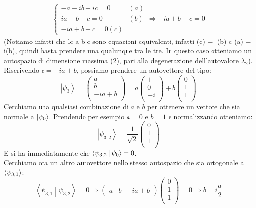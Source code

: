 \documentclass[../../FisicaTeorica.tex]{subfiles}
\begin{document}
\begin{enumerate}
\begin{itemize}
\begin{align*}
	\begin{cases}
	-a -ib +ic = 0 & (a)\\
	ia -b +c =0 & (b)\\
	-ia +b -c = 0 (c)
	\end{cases}
	\Rightarrow 
	-ia+b -c=0
	\end{align*}
	(Notiamo infatti che le a-b-c sono equazioni equivalenti, infatti (c) = -(b) e (a) = i(b), quindi basta prendere una qualunque tra le tre. In questo caso otteniamo un autospazio di dimensione massima (2), pari alla degenerazione dell'autovalore $\lambda_2$).\\
	Riscrivendo $c = -ia + b$, possiamo prendere un autovettore del tipo:
	\[
	\left|\psi_3\right\rangle= \left(\begin{matrix}a\\b\\-ia+b\\\end{matrix}\right)=a\left(\begin{matrix}1\\0\\-i\\\end{matrix}\right)+b\left(\begin{matrix}0\\1\\1\\\end{matrix}\right)
	\]
	Cerchiamo una qualsiasi combinazione di $a$ e $b$ per ottenere un vettore che sia normale a $\Ket{\psi_0}$. Prendendo per esempio $a=0$ e $b=1$ e normalizzando otteniamo:
	\[
	\left|\psi_{3,2}\right\rangle=\frac{1}{\sqrt2}\left(\begin{matrix}0\\1\\1\\\end{matrix}\right)
	\]
	E si ha immediatamente che $\Braket{\psi_{3,2}|\psi_0} = 0$.\\
	Cerchiamo ora un altro autovettore nello stesso autospazio che sia ortogonale a $\Braket{\psi_{3,1}}$:
	\[
	\left\langle\psi_{3,1}\middle|\psi_{3,2}\right\rangle=0 \Rightarrow
	\begin{pmatrix}a&b&-ia+b\end{pmatrix}\left(\begin{matrix}0\\1\\1\\\end{matrix}\right)=0\Rightarrow b=i \frac{a}{2}
\]
\end{itemize}
\end{enumerate}
\end{document}
